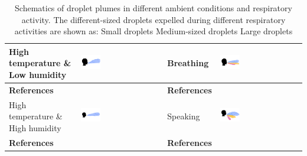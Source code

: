 \documentclass[a4paper,12pt]{elsarticle}
\DeclareRobustCommand{\legendsquare}[1]{%
  \tikz[baseline=(a.south)]{\node[#1, inner sep=.8ex, outer sep=0] (a) {};}%
  }
\begin{document}
\begin{table}[h!]
\begin{tabular}{|m{2.5cm}|m{4cm}||m{2.5cm}|m{4cm}|}
    \hline
    High temperature \& Low humidity & \includegraphics[clip,trim={0 2cm 0 2cm},width=0.25\textwidth]{Droplets/dropmat3.jpeg}& Breathing & \includegraphics[clip,trim={0 2cm 0 2cm},width=0.25\textwidth]{Droplets/dropmat7.jpeg} \\
    \hline
    \textbf{References} & \cite{zhang2019distribution,feng2020study,sen2021transmission} & \textbf{References} & \cite{he2011cfd,villafruela2019assessment,duill2021impact,shao2021risk,luo2022role,wang2022evaluation,wei2023effects} \\
    \hline
   High temperature \& High humidity & \includegraphics[clip,trim={0 2cm 0 2cm},width=0.25\textwidth]{Droplets/dropmat4.jpeg}& Speaking & \includegraphics[clip,trim={0 2cm 0 2cm},width=0.25\textwidth]{Droplets/dropmat8.jpeg} \\
    \hline
    \textbf{References} & \cite{zhang2019distribution,chong2021extended} & \textbf{References} & \cite{vuorinen2020modelling,zhou2021experimental,wang2022evaluation,wei2023effects} \\
    \hline
    \end{tabular}
    \caption{Schematics of droplet plumes in different ambient conditions and respiratory activity. The different-sized droplets expelled during different respiratory activities are shown as: \legendsquare{fill=resp} Small droplets \legendsquare{fill=vent} Medium-sized droplets \legendsquare{fill=therm} Large droplets }
    \label{tab:mat2}
\end{table}
\end{document}
